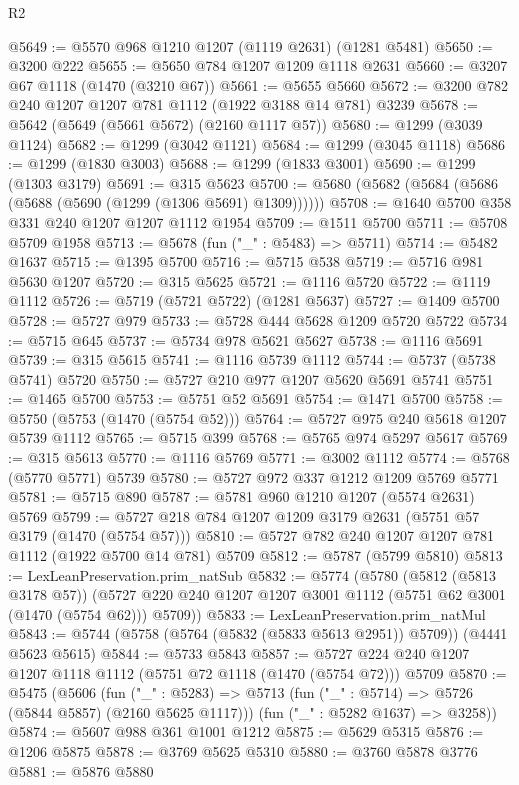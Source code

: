 \begin{lexlean}{R2}
\begin{coremodule}
@5649 := @5570 @968 @1210 @1207 (@1119 @2631) (@1281 @5481)
@5650 := @3200 @222
@5655 := @5650 @784 @1207 @1209 @1118 @2631
@5660 := @3207 @67 @1118 (@1470 (@3210 @67))
@5661 := @5655 @5660
@5672 := @3200 @782 @240 @1207 @1207 @781 @1112 (@1922 @3188 @14 @781) @3239
@5678 := @5642 (@5649 (@5661 @5672) (@2160 @1117 @57))
@5680 := @1299 (@3039 @1124)
@5682 := @1299 (@3042 @1121)
@5684 := @1299 (@3045 @1118)
@5686 := @1299 (@1830 @3003)
@5688 := @1299 (@1833 @3001)
@5690 := @1299 (@1303 @3179)
@5691 := @315 @5623
@5700 := @5680 (@5682 (@5684 (@5686 (@5688 (@5690 (@1299 (@1306 @5691) @1309))))))
@5708 := @1640 @5700 @358 @331 @240 @1207 @1207 @1112 @1954
@5709 := @1511 @5700
@5711 := @5708 @5709 @1958
@5713 := @5678 (fun ("_" : @5483) => @5711)
@5714 := @5482 @1637
@5715 := @1395 @5700
@5716 := @5715 @538
@5719 := @5716 @981 @5630 @1207
@5720 := @315 @5625
@5721 := @1116 @5720
@5722 := @1119 @1112
@5726 := @5719 (@5721 @5722) (@1281 @5637)
@5727 := @1409 @5700
@5728 := @5727 @979
@5733 := @5728 @444 @5628 @1209 @5720 @5722
@5734 := @5715 @645
@5737 := @5734 @978 @5621 @5627
@5738 := @1116 @5691
@5739 := @315 @5615
@5741 := @1116 @5739 @1112
@5744 := @5737 (@5738 @5741) @5720
@5750 := @5727 @210 @977 @1207 @5620 @5691 @5741
@5751 := @1465 @5700
@5753 := @5751 @52 @5691
@5754 := @1471 @5700
@5758 := @5750 (@5753 (@1470 (@5754 @52)))
@5764 := @5727 @975 @240 @5618 @1207 @5739 @1112
@5765 := @5715 @399
@5768 := @5765 @974 @5297 @5617
@5769 := @315 @5613
@5770 := @1116 @5769
@5771 := @3002 @1112
@5774 := @5768 (@5770 @5771) @5739
@5780 := @5727 @972 @337 @1212 @1209 @5769 @5771
@5781 := @5715 @890
@5787 := @5781 @960 @1210 @1207 (@5574 @2631) @5769
@5799 := @5727 @218 @784 @1207 @1209 @3179 @2631 (@5751 @57 @3179 (@1470 (@5754 @57)))
@5810 := @5727 @782 @240 @1207 @1207 @781 @1112 (@1922 @5700 @14 @781) @5709
@5812 := @5787 (@5799 @5810)
@5813 := LexLeanPreservation.prim_natSub
@5832 := @5774
    (@5780
      (@5812 (@5813 @3178 @57))
      (@5727 @220 @240 @1207 @1207 @3001 @1112 (@5751 @62 @3001 (@1470 (@5754 @62))) @5709))
@5833 := LexLeanPreservation.prim_natMul
@5843 := @5744 (@5758 (@5764 (@5832 (@5833 @5613 @2951)) @5709)) (@4441 @5623 @5615)
@5844 := @5733 @5843
@5857 := @5727 @224 @240 @1207 @1207 @1118 @1112 (@5751 @72 @1118 (@1470 (@5754 @72))) @5709
@5870 := @5475
    (@5606
      (fun ("_" : @5283) => @5713 (fun ("_" : @5714) => @5726 (@5844 @5857) (@2160 @5625 @1117)))
      (fun ("_" : @5282 @1637) => @3258))
@5874 := @5607 @988 @361 @1001 @1212
@5875 := @5629 @5315
@5876 := @1206 @5875
@5878 := @3769 @5625 @5310
@5880 := @3760 @5878 @3776
@5881 := @5876 @5880

\end{coremodule}
\end{lexlean}
